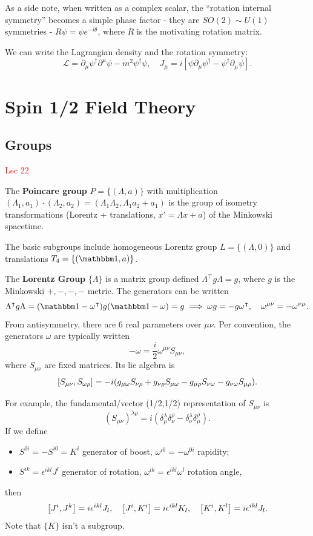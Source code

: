 \documentclass{article}
\begin{document}
As a side note, when written as a complex scalar, the ``rotation internal symmetry'' becomes a simple phase factor - they are $SO(2)\sim U(1)$ symmetries - $R\psi = \psi e^{-i\theta}$, where $R$ is the motivating rotation matrix. 

We can write the Lagrangian density and the rotation symmetry:
$$\mathcal L=\partial_\mu\psi^\dag\partial^\mu\psi-m^2\psi^\dag\psi,\quad J_\mu= i\left[\psi\partial_\mu\psi^\dag-\psi^\dag\partial_\mu\psi\right].$$

\pagebreak

\section{Spin 1/2 Field Theory}

\subsection{Groups}

\textcolor{red}{Lec 22}

The \textbf{Poincare group} $P=\{(\Lambda,a)\}$ with multiplication $(\Lambda_1,a_1)\cdot (\Lambda_2,a_2)=(\Lambda_1\Lambda_2,\Lambda_1a_2+a_1)$ is the group of isometry transformations (Lorentz + translations, $x'=\Lambda x+a$) of the Minkowski spacetime. 

The basic subgroups include homogeneous Lorentz group $L=\{(\Lambda,0)\}$ and translations $T_4=\{(\mathbbm 1,a)\}$.

The \textbf{Lorentz Group} $\{\Lambda\}$ is a matrix group defined $\Lambda^\intercal g\Lambda=g$, where $g$ is the Minkowski $+,-,-,-$ metric. The generators can be written 
$$\Lambda^\intercal g\Lambda=(\mathbbm 1-\omega^\intercal)g(\mathbbm 1-\omega)=g\implies\omega g=-g\omega^\intercal,\quad \omega^{\mu\nu}=-\omega^{\nu\mu}.$$
From antisymmetry, there are 6 real parameters over $\mu\nu$. Per convention, the generators $\omega$ are typically written 
$$-\omega=\frac i2\omega^{\mu\nu}S_{\mu\nu},$$
where $S_{\mu\nu}$ are fixed matrices. Its lie algebra is 
$$\comm{S_{\mu\nu}}{S_{\omega\rho}}=-i(g_{\mu\omega}S_{\nu\rho}+g_{\nu\rho}S_{\mu\omega}-g_{\mu\rho}S_{\nu\omega}-g_{\nu\omega}S_{\mu\rho}).$$

For example, the fundamental/vector (1/2,1/2) representation of $S_{\mu\nu}$ is
$$(S_{\mu\nu})^{\lambda\rho}=i(\delta^\lambda_\mu\delta^\rho_\nu-\delta^\lambda_\nu\delta^\rho_\mu).$$
If we define 
\begin{itemize}
    \item $S^{0i}=-S^{i0}=K^i$ generator of boost, $\omega^{i0}=-\omega^{0i}$ rapidity;
    \item $S^{ik}=\epsilon^{ikl}J^l$ generator of rotation, $\omega^{ik}=\epsilon^{ikl}\omega^l$ rotation angle,
\end{itemize}
then 
$$\comm{J^i}{J^k}=i\epsilon^{ikl}J_l,\quad\comm{J^i}{K^i}=i\epsilon^{ikl}K_l,\quad\comm{K^i}{K^l}=i\epsilon^{ikl}J_l.$$
Note that $\{K\}$ isn't a subgroup.
\end{document}
